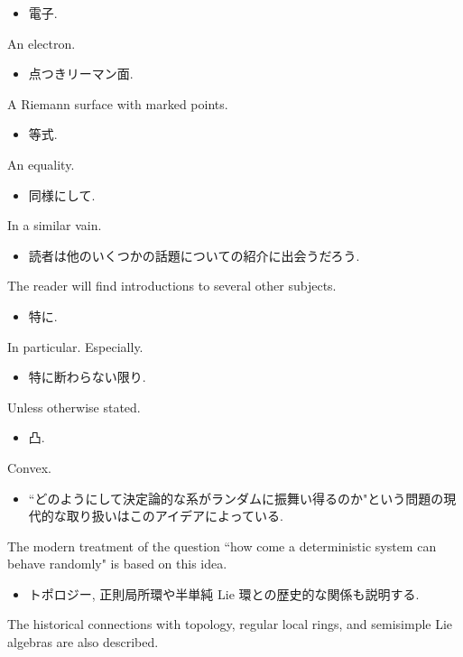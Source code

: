 \documentclass[openany, a4paper, oneside]{jsbook}
\begin{document}
\begin{itemize}
\item 電子.
\end{itemize}
An electron.

\begin{itemize}
\item 点つきリーマン面.
\end{itemize}
A Riemann surface with marked points.

\begin{itemize}
\item 等式.
\end{itemize}
An equality.

\begin{itemize}
\item 同様にして.
\end{itemize}
In a similar vain.

\begin{itemize}
\item 読者は他のいくつかの話題についての紹介に出会うだろう.  \cite{CharlesWeibel1}
\end{itemize}
The reader will find introductions to several other subjects.

\begin{itemize}
\item 特に.
\end{itemize}
In particular. Especially.

\begin{itemize}
\item 特に断わらない限り.
\end{itemize}
Unless otherwise stated.

\begin{itemize}
\item 凸.
\end{itemize}
Convex.

\begin{itemize}
\item ``どのようにして決定論的な系がランダムに振舞い得るのか"という問題の現代的な取り扱いはこのアイデアによっている. \cite{OmriSarig1}
\end{itemize}
The modern treatment of the question ``how come a deterministic system can behave randomly" is based on this idea.

\begin{itemize}
\item トポロジー, 正則局所環や半単純 Lie 環との歴史的な関係も説明する. \cite{CharlesWeibel1}
\end{itemize}
The historical connections with topology, regular local rings, and semisimple Lie algebras are also described.
\end{document}
